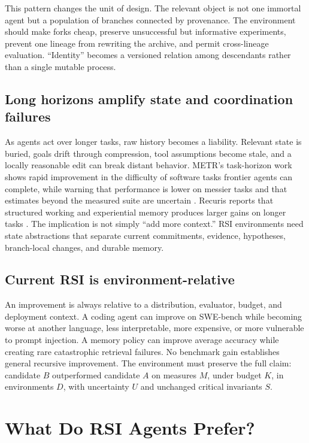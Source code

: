 \documentclass[11pt,a4paper]{article}
\begin{document}
This pattern changes the unit of design. The relevant object is not one immortal agent but a population of branches connected by provenance. The environment should make forks cheap, preserve unsuccessful but informative experiments, prevent one lineage from rewriting the archive, and permit cross-lineage evaluation. ``Identity'' becomes a versioned relation among descendants rather than a single mutable process.

\subsection{Long horizons amplify state and coordination failures}

As agents act over longer tasks, raw history becomes a liability. Relevant state is buried, goals drift through compression, tool assumptions become stale, and a locally reasonable edit can break distant behavior. METR's task-horizon work shows rapid improvement in the difficulty of software tasks frontier agents can complete, while warning that performance is lower on messier tasks and that estimates beyond the measured suite are uncertain \cite{metrtime}. Recuris reports that structured working and experiential memory produces larger gains on longer tasks \cite{recuris}. The implication is not simply ``add more context.'' RSI environments need state abstractions that separate current commitments, evidence, hypotheses, branch-local changes, and durable memory.

\subsection{Current RSI is environment-relative}

An improvement is always relative to a distribution, evaluator, budget, and deployment context. A coding agent can improve on SWE-bench while becoming worse at another language, less interpretable, more expensive, or more vulnerable to prompt injection. A memory policy can improve average accuracy while creating rare catastrophic retrieval failures. No benchmark gain establishes general recursive improvement. The environment must preserve the full claim: candidate $B$ outperformed candidate $A$ on measures $M$, under budget $K$, in environments $D$, with uncertainty $U$ and unchanged critical invariants $S$.

\section{What Do RSI Agents Prefer?}
\end{document}
